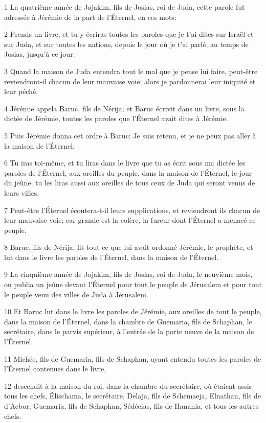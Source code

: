 \par 1 La quatrième année de Jojakim, fils de Josias, roi de Juda, cette parole fut adressée à Jérémie de la part de l'Éternel, en ces mots:
\par 2 Prends un livre, et tu y écriras toutes les paroles que je t'ai dites sur Israël et sur Juda, et sur toutes les nations, depuis le jour où je t'ai parlé, au temps de Josias, jusqu'à ce jour.
\par 3 Quand la maison de Juda entendra tout le mal que je pense lui faire, peut-être reviendront-il chacun de leur mauvaise voie; alors je pardonnerai leur iniquité et leur péché.
\par 4 Jérémie appela Baruc, fils de Nérija; et Baruc écrivit dans un livre, sous la dictée de Jérémie, toutes les paroles que l'Éternel avait dites à Jérémie.
\par 5 Puis Jérémie donna cet ordre à Baruc: Je suis retenu, et je ne peux pas aller à la maison de l'Éternel.
\par 6 Tu iras toi-même, et tu liras dans le livre que tu as écrit sous ma dictée les paroles de l'Éternel, aux oreilles du peuple, dans la maison de l'Éternel, le jour du jeûne; tu les liras aussi aux oreilles de tous ceux de Juda qui seront venus de leurs villes.
\par 7 Peut-être l'Éternel écoutera-t-il leurs supplications, et reviendront ils chacun de leur mauvaise voie; car grande est la colère, la fureur dont l'Éternel a menacé ce peuple.
\par 8 Baruc, fils de Nérija, fit tout ce que lui avait ordonné Jérémie, le prophète, et lut dans le livre les paroles de l'Éternel, dans la maison de l'Éternel.
\par 9 La cinquième année de Jojakim, fils de Josias, roi de Juda, le neuvième mois, on publia un jeûne devant l'Éternel pour tout le peuple de Jérusalem et pour tout le peuple venu des villes de Juda à Jérusalem.
\par 10 Et Baruc lut dans le livre les paroles de Jérémie, aux oreilles de tout le peuple, dans la maison de l'Éternel, dans la chambre de Guemaria, fils de Schaphan, le secrétaire, dans le parvis supérieur, à l'entrée de la porte neuve de la maison de l'Éternel.
\par 11 Michée, fils de Guemaria, fils de Schaphan, ayant entendu toutes les paroles de l'Éternel contenues dans le livre,
\par 12 descendit à la maison du roi, dans la chambre du secrétaire, où étaient assis tous les chefs, Élischama, le secrétaire, Delaja, fils de Schemaeja, Elnathan, fils de d'Acbor, Guemaria, fils de Schaphan, Sédécias, fils de Hanania, et tous les autres chefs.
